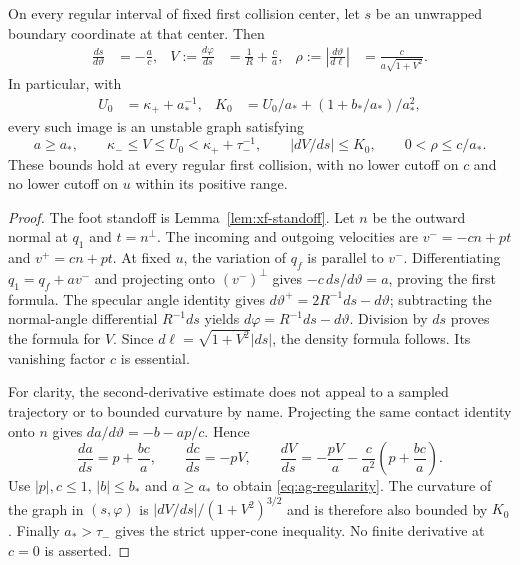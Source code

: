 \begin{theorem}
\label{thm:ag-density}
On every regular interval of fixed first collision center, let $s$
be an unwrapped boundary coordinate at that center. Then
\begin{align}
 \frac{ds}{d\vartheta}&=-\frac{a}{c},&
 V:=\frac{d\varphi}{ds}&=\frac1R+\frac{c}{a},&
 \rho:=\left|\frac{d\vartheta}{d\ell}\right|
     &=\frac{c}{a\sqrt{1+V^2}}.\label{eq:ag-density}
\end{align}
In particular, with
\begin{align}
 U_0&=\kappa_++a_*^{-1},&
 K_0&=U_0/a_*+(1+b_*/a_*)/a_*^2,\label{eq:ag-geometry-constants}
\end{align}
every such image is an unstable graph satisfying
\begin{equation}\label{eq:ag-regularity}
 a\ge a_*,\qquad \kappa_-\le V\le U_0
 <\kappa_++\tau_-^{-1},\qquad
 |dV/ds|\le K_0,\qquad 0<\rho\le c/a_*.
\end{equation}
These bounds hold at every regular first collision, with no lower
cutoff on $c$ and no lower cutoff on $u$ within its positive range.
\end{theorem}
\begin{proof}
The foot standoff is Lemma~\ref{lem:xf-standoff}. Let $n$ be the
outward normal at $q_1$ and $t=n^\perp$. The incoming and outgoing
velocities are $v^-=-cn+pt$ and $v^+=cn+pt$. At fixed $u$, the
variation of $q_f$ is parallel to $v^-$. Differentiating
$q_1=q_f+a v^-$ and projecting onto $(v^-)^\perp$ gives
$-c\,ds/d\vartheta=a$, proving the first formula. The specular
angle identity gives
$d\vartheta^+=2R^{-1}ds-d\vartheta$; subtracting the normal-angle
differential $R^{-1}ds$ yields
$d\varphi=R^{-1}ds-d\vartheta$. Division by $ds$ proves the
formula for $V$. Since $d\ell=\sqrt{1+V^2}|ds|$, the density
formula follows. Its vanishing factor $c$ is essential.

For clarity, the second-derivative estimate does not appeal to a
sampled trajectory or to bounded curvature by name. Projecting the
same contact identity onto $n$ gives
$da/d\vartheta=-b-ap/c$. Hence
\begin{equation}\label{eq:ag-a-derivative}
 \frac{da}{ds}=p+\frac{bc}{a},\qquad
 \frac{dc}{ds}=-pV,\qquad
 \frac{dV}{ds}=-\frac{pV}{a}
               -\frac{c}{a^2}\left(p+\frac{bc}{a}\right).
\end{equation}
Use $|p|,c\le1$, $|b|\le b_*$ and $a\ge a_*$ to obtain
\eqref{eq:ag-regularity}. The curvature of the graph in
$(s,\varphi)$ is $|dV/ds|/(1+V^2)^{3/2}$ and is therefore also
bounded by $K_0$. Finally $a_*>\tau_-$ gives the strict upper-cone
inequality. No finite derivative at $c=0$ is asserted.
\end{proof}

